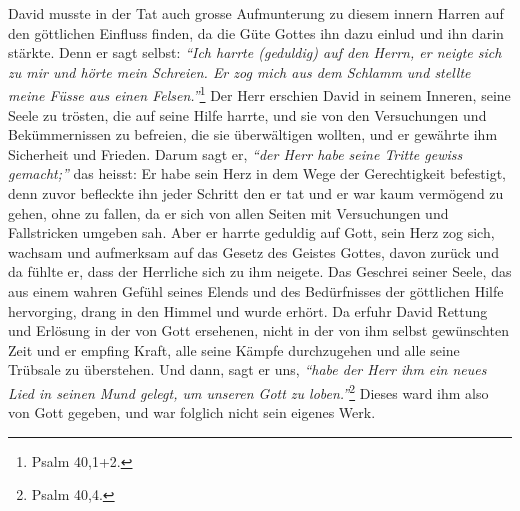David musste in der Tat auch grosse Aufmunterung zu
diesem innern Harren
auf den göttlichen Einfluss finden, da die Güte Gottes ihn dazu einlud und ihn
darin stärkte. Denn er sagt selbst:
\textit{"`Ich harrte (geduldig) auf den Herrn,
er neigte sich zu mir und hörte mein Schreien. Er zog mich aus dem Schlamm und
stellte meine Füsse aus einen Felsen."'}\footnote{Psalm 40,1+2.}
Der Herr
erschien David in seinem Inneren, seine Seele zu trösten, die auf
seine Hilfe
harrte, und sie von den Versuchungen und Bekümmernissen zu befreien, die sie
überwältigen wollten, und er gewährte ihm Sicherheit und Frieden. Darum sagt er,
\textit{"`der Herr habe seine Tritte gewiss gemacht;"'}
das heisst: Er habe sein Herz in
dem Wege der Gerechtigkeit befestigt, denn zuvor befleckte ihn jeder Schritt den
er tat und er war kaum vermögend zu gehen, ohne zu fallen, da er sich von
allen Seiten mit Versuchungen und Fallstricken umgeben sah. Aber er harrte
geduldig auf Gott, sein Herz zog sich, wachsam und aufmerksam auf das Gesetz des
Geistes Gottes, davon zurück und da fühlte er, dass der Herrliche sich zu ihm
neigete. Das Geschrei seiner Seele, das aus einem
wahren Gefühl seines Elends
und des Bedürfnisses der göttlichen Hilfe hervorging, drang in den Himmel und
wurde erhört. Da erfuhr David Rettung und Erlösung in der von Gott ersehenen,
nicht in der von ihm selbst gewünschten Zeit und er empfing Kraft, alle seine
Kämpfe durchzugehen und alle seine Trübsale zu überstehen. Und dann, sagt er
uns,
\textit{"`habe der Herr ihm ein neues Lied in seinen Mund gelegt, um unseren
Gott
zu loben."'}\footnote{Psalm 40,4.}
Dieses ward ihm also von Gott gegeben, und war
folglich nicht sein eigenes Werk.

\medskip

